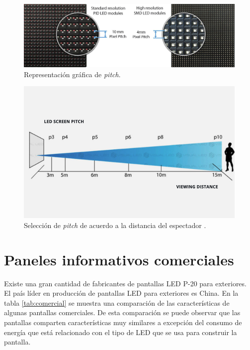 \begin{figure}[htpb]
	\centering
	\includegraphics[scale=0.3]{Figures/pitch.jpg} 
	\caption{Representación gráfica de \textit{pitch}\protect\footnotemark.}
	\label{fig:pixelpitch}
\end{figure}

\begin{figure}[htpb]
	\centering
	\includegraphics[scale=0.6]{Figures/visionpitch.jpg} 
	\caption{Selección de \textit{pitch} de acuerdo a la distancia del espectador \protect\footnotemark.}
	\label{fig:pitchview}
\end{figure}

\pagebreak




\section{Paneles informativos comerciales}
Existe una gran cantidad de fabricantes de pantallas LED P-20 para exteriores. El país líder en producción de pantallas LED para exteriores es China. En la tabla \ref{tab:comercial} se muestra una comparación de las características de algunas pantallas comerciales. De esta comparación se puede observar que las pantallas comparten características muy similares a excepción del consumo de energía que está relacionado con el tipo de LED que se usa para construir la pantalla. 


